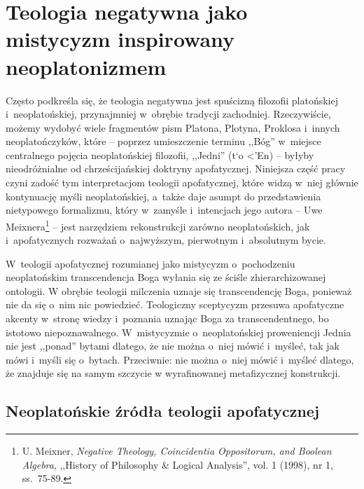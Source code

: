 

\chapter{Teologia negatywna jako mistycyzm inspirowany neoplatonizmem}\label{neopl}

Często podkreśla się, że teologia negatywna jest spuścizną filozofii platońskiej i~neoplatońskiej, przynajmniej w~obrębie tradycji zachodniej. Rzeczywiście, możemy wydobyć wiele fragmentów pism Platona, Plotyna, Proklosa i~innych neoplatończyków, które -- poprzez umieszczenie terminu ,,Bóg'' w~miejsce centralnego pojęcia neoplatońskiej filozofii, ,,Jedni'' (\textgreek{t`o <'En}) -- byłyby nieodróżnialne od chrześcijańskiej doktryny apofatycznej. Niniejsza część pracy czyni zadość tym interpretacjom teologii apofatycznej, które widzą w~niej głównie kontynuację myśli neoplatońskiej, a~także daje asumpt do przedstawienia nietypowego formalizmu, który w~zamyśle i~intencjach jego autora -- Uwe Meixnera\footnote{U. Meixner, \textit{Negative Theology, Coincidentia Oppositorum, and Boolean Algebra}, ,,History of Philosophy \& Logical Analysis'', vol. 1 (1998), nr 1, ss.~75-89.} -- jest narzędziem rekonstrukcji zarówno neoplatońskich, jak i~apofatycznych rozważań o~najwyższym, pierwotnym i~absolutnym bycie.

W~teologii apofatycznej rozumianej jako mistycyzm o~pochodzeniu neoplatońskim transcendencja Boga wyłania się ze ściśle zhierarchizowanej ontologii. W obrębie teologii milczenia uznaje się transcendencję Boga, ponieważ nie da się o~nim nic powiedzieć. Teologiczny sceptycyzm przesuwa apofatyczne akcenty w~stronę wiedzy i~poznania uznając Boga za transcendentnego, bo istotowo niepoznawalnego. W~mistycyzmie o~neoplatońskiej proweniencji Jednia nie jest ,,ponad'' bytami dlatego, że nie można o~niej mówić i~myśleć, tak jak mówi i~myśli się o~bytach. Przeciwnie: nie można o~niej mówić i~myśleć dlatego, że znajduje się na samym szczycie w wyrafinowanej metafizycznej konstrukcji.


\section{Neoplatońskie źródła teologii apofatycznej}

